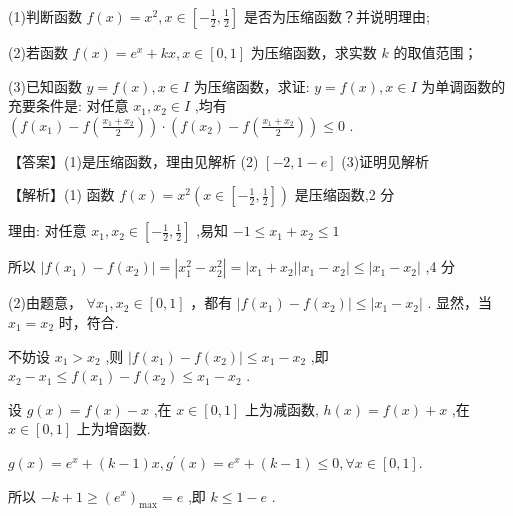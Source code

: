 \documentclass[10pt]{article}
\begin{document}
(1)判断函数 \(f\left( x\right)  = {x}^{2},x \in  \left\lbrack  {-\frac{1}{2},\frac{1}{2}}\right\rbrack\) 是否为压缩函数？并说明理由;

(2)若函数 \(f\left( x\right)  = {e}^{x} + {kx},x \in  \left\lbrack  {0,1}\right\rbrack\) 为压缩函数，求实数 \(k\) 的取值范围；

(3)已知函数 \(y = f\left( x\right) ,x \in  I\) 为压缩函数，求证: \(y = f\left( x\right) ,x \in  I\) 为单调函数的充要条件是: 对任意 \({x}_{1},{x}_{2} \in  I\) ,均有 \(\left( {f\left( {x}_{1}\right)  - f\left( \frac{{x}_{1} + {x}_{2}}{2}\right) }\right)  \cdot  \left( {f\left( {x}_{2}\right)  - f\left( \frac{{x}_{1} + {x}_{2}}{2}\right) }\right)  \leq  0\) .

【答案】(1)是压缩函数，理由见解析 (2) \(\left\lbrack  {-2,1 - e}\right\rbrack\) (3)证明见解析

【解析】(1) 函数 \(f\left( x\right)  = {x}^{2}\left( {x \in  \left\lbrack  {-\frac{1}{2},\frac{1}{2}}\right\rbrack  }\right)\) 是压缩函数,2 分

理由: 对任意 \({x}_{1},{x}_{2} \in  \left\lbrack  {-\frac{1}{2},\frac{1}{2}}\right\rbrack\) ,易知 \(- 1 \leq  {x}_{1} + {x}_{2} \leq  1\)

所以 \(\left| {f\left( {x}_{1}\right)  - f\left( {x}_{2}\right) }\right|  = \left| {{x}_{1}^{2} - {x}_{2}^{2}}\right|  = \left| {{x}_{1} + {x}_{2}}\right| \left| {{x}_{1} - {x}_{2}}\right|  \leq  \left| {{x}_{1} - {x}_{2}}\right|\) ,4 分

(2)由题意， \(\forall {x}_{1},{x}_{2} \in  \left\lbrack  {0,1}\right\rbrack\) ，都有 \(\left| {f\left( {x}_{1}\right)  - f\left( {x}_{2}\right) }\right|  \leq  \left| {{x}_{1} - {x}_{2}}\right|\) . 显然，当 \({x}_{1} = {x}_{2}\) 时，符合.

不妨设 \({x}_{1} > {x}_{2}\) ,则 \(\left| {f\left( {x}_{1}\right)  - f\left( {x}_{2}\right) }\right|  \leq  {x}_{1} - {x}_{2}\) ,即 \({x}_{2} - {x}_{1} \leq  f\left( {x}_{1}\right)  - f\left( {x}_{2}\right)  \leq  {x}_{1} - {x}_{2}\) .

设 \(g\left( x\right)  = f\left( x\right)  - x\) ,在 \(x \in  \left\lbrack  {0,1}\right\rbrack\) 上为减函数, \(h\left( x\right)  = f\left( x\right)  + x\) ,在 \(x \in  \left\lbrack  {0,1}\right\rbrack\) 上为增函数.

\(g\left( x\right)  = {e}^{x} + \left( {k - 1}\right) x,{g}^{\prime }\left( x\right)  = {e}^{x} + \left( {k - 1}\right)  \leq  0,\forall x \in  \left\lbrack  {0,1}\right\rbrack  .\)

所以 \(- k + 1 \geq  {\left( {e}^{x}\right) }_{\max } = e\) ,即 \(k \leq  1 - e\) .
\end{document}
